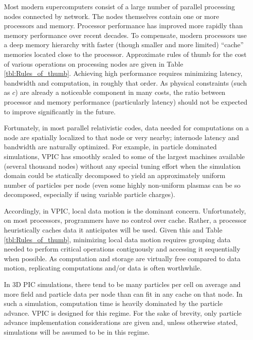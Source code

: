 \documentclass[letter,10pt]{article}
\newcommand{\tbl}[1]{Table \ref{tbl:#1}}
\begin{document}
Most modern supercomputers consist of a large number of parallel
processing nodes connected by network.  The nodes themselves contain
one or more processors and memory.  Processor performance has improved
more rapidly than memory performance over recent decades.  To
compensate, modern processors use a deep memory hierarchy with faster
(though smaller and more limited) ``cache'' memories located close to
the processor.  Approximate rules of thumb for the cost of various
operations on processing nodes are given in \tbl{Rules_of_thumb}.
Achieving high performance requires minimizing latency, bandwidth and
computation, in roughly that order.  As physical constraints (such as
$c$) are already a noticeable component in many costs, the ratio
between processor and memory performance (particularly latency) should
not be expected to improve significantly in the future.

Fortunately, in most parallel relativistic codes, data needed for
computations on a node are spatially localized to that node or very
nearby; internode latency and bandwidth are naturally optimized.  For
example, in particle dominated simulations, VPIC has smoothly scaled
to some of the largest machines available (several thousand nodes)
without any special tuning effort when the simulation domain could be
statically decomposed to yield an approximately uniform number of
particles per node (even some highly non-uniform plasmas can be so
decomposed, especially if using variable particle charges).

Accordingly, in VPIC, local data motion is the dominant concern.
Unfortunately, on most processors, programmers have no control over
cache.  Rather, a processor heuristically caches data it anticipates
will be used.  Given this and \tbl{Rules_of_thumb}, minimizing local
data motion requires grouping data needed to perform critical
operations contiguously and accessing it sequentially when possible.
As computation and storage are virtually free compared to data motion,
replicating computations and/or data is often worthwhile.

In 3D PIC simulations, there tend to be many particles per cell on
average and more field and particle data per node than can fit in any
cache on that node.  In such a simulation, computation time is heavily
dominated by the particle advance.  VPIC is designed for this regime.
For the sake of brevity, only particle advance implementation
considerations are given and, unless otherwise stated, simulations
will be assumed to be in this regime.
\end{document}
